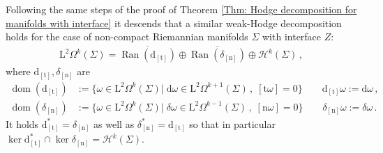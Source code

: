 	Following the same steps of the proof of Theorem \ref{Thm: Hodge decomposition for manifolds with interface} it descends that a similar weak-Hodge decomposition holds for the case of non-compact Riemannian manifolds $\Sigma$ with interface $Z$:
	\begin{align}\label{Eqn: weak-Hodge decomposition for interface}
		\mathrm{L}^2\Omega^k(\Sigma)=
		\overline{\operatorname{Ran}(\mathrm{d}_{[\mathrm{t}]})}\oplus
		\overline{\operatorname{Ran}(\delta_{[\mathrm{n}]})}\oplus
		\mathcal{H}^k(\Sigma)\,,
	\end{align}
	where $\mathrm{d}_{[\mathrm{t}]}, \delta_{[\mathrm{n}]}$ are
	\begin{align*}
	\operatorname{dom}(\mathrm{d}_{[\mathrm{t}]})&:=\lbrace
	\omega\in\mathrm{L}^2\Omega^k(\Sigma)|\;\mathrm{d}\omega\in\mathrm{L}^2\Omega^{k+1}(\Sigma)\,,\;[\mathrm{t}\omega]=0\rbrace\qquad
	\mathrm{d}_{[\mathrm{t}]}\omega:=\mathrm{d}\omega\,,\\
	\operatorname{dom}(\delta_{[\mathrm{n}]})&:=\lbrace
	\omega\in\mathrm{L}^2\Omega^k(\Sigma)|\;\delta\omega\in\mathrm{L}^2\Omega^{k-1}(\Sigma)\,,\;[\mathrm{n}\omega]=0\rbrace\qquad
	\delta_{[\mathrm{n}]}\omega:=\delta\omega\,.
	\end{align*}
It holds $\mathrm{d}_{[\mathrm{t}]}^*=\delta_{[\mathrm{n}]}$ as well as $\delta_{[\mathrm{n}]}^*=\mathrm{d}_{[\mathrm{t}]}$ so that in particular $\ker\mathrm{d}_{[\mathrm{t}]}^*\cap\ker\delta_{[\mathrm{n}]}=\mathcal{H}^k(\Sigma)$.
	

	
	
